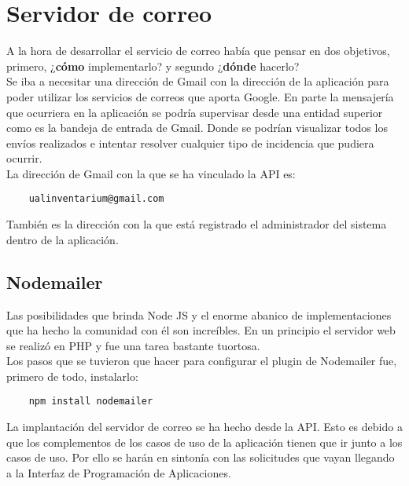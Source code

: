 \section{Servidor de correo}
A la hora de desarrollar el servicio de correo había que pensar en dos objetivos, primero, ¿\textbf{cómo} implementarlo? y segundo ¿\textbf{dónde} hacerlo?
\\Se iba a necesitar una dirección de Gmail con la dirección de la aplicación para poder utilizar los servicios de correos que aporta Google. En parte la mensajería que ocurriera en la aplicación se podría supervisar desde una entidad superior como es la bandeja de entrada de Gmail. Donde se podrían visualizar todos los envíos realizados e intentar resolver cualquier tipo de incidencia que pudiera ocurrir.
\\La dirección de Gmail con la que se ha vinculado la API es:
\begin{verbatim}
    ualinventarium@gmail.com
\end{verbatim}
También es la dirección con la que está registrado el administrador del sistema dentro de la aplicación.

\subsection{Nodemailer}
Las posibilidades que brinda Node JS y el enorme abanico de implementaciones que ha hecho la comunidad con él son increíbles. En un principio el servidor web se realizó en PHP y fue una tarea bastante tuortosa.
\\Los pasos que se tuvieron que hacer para configurar el plugin de Nodemailer fue, primero de todo, instalarlo:
\begin{verbatim}
    npm install nodemailer
\end{verbatim}
La implantación del servidor de correo se ha hecho desde la API. Esto es debido a que los complementos de los casos de uso de la aplicación tienen que ir junto a los casos de uso. Por ello se harán en sintonía con las solicitudes que vayan llegando a la Interfaz de Programación de Aplicaciones.

